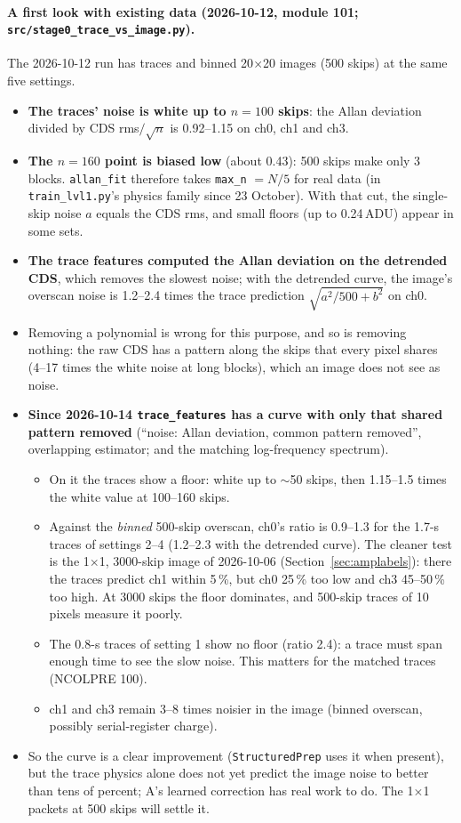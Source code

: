 \documentclass[10pt]{article}
\newcommand{\code}[1]{\texttt{#1}}
\begin{document}
\paragraph{A first look with existing data (2026-10-12, module 101; \code{src/stage0\_trace\_vs\_image.py}).} The 2026-10-12 run has
traces and binned 20$\times$20 images (500 skips) at the same five settings.
\begin{itemize}
\item \textbf{The traces' noise is white up to $n = 100$ skips}: the Allan deviation divided by CDS rms$/\sqrt n$ is 0.92--1.15 on ch0, ch1 and ch3.
\item \textbf{The $n = 160$ point is biased low} (about 0.43): 500 skips make only 3 blocks. \code{allan\_fit} therefore takes
  \code{max\_n} $= N/5$ for real data (in \code{train\_lvl1.py}'s physics family since 23 October). With that cut, the single-skip noise $a$ equals the CDS rms, and small floors (up to 0.24\,ADU)
  appear in some sets.
\item \textbf{The trace features computed the Allan deviation on the detrended CDS}, which removes the slowest noise; with the
  detrended curve, the image's overscan noise is 1.2--2.4 times the trace prediction $\sqrt{a^2/500 + b^2}$ on ch0.
\item Removing a polynomial is wrong for this purpose, and so is removing nothing: the raw CDS has a pattern along the skips that every
  pixel shares (4--17 times the white noise at long blocks), which an image does not see as noise.
\item \textbf{Since 2026-10-14 \code{trace\_features} has a curve with only that shared pattern removed} (``noise: Allan deviation,
  common pattern removed'', overlapping estimator; and the matching log-frequency spectrum).
  \begin{itemize}
  \item On it the traces show a floor: white up to $\sim$50 skips, then 1.15--1.5 times the white value at 100--160 skips.
  \item Against the \emph{binned} 500-skip overscan, ch0's ratio is 0.9--1.3 for the 1.7-s traces of settings 2--4 (1.2--2.3 with the
    detrended curve). The cleaner test is the 1$\times$1, 3000-skip image of 2026-10-06 (Section~\ref{sec:amplabels}): there the traces
    predict ch1 within 5\,\%, but ch0 25\,\% too low and ch3 45--50\,\% too high. At 3000 skips the floor dominates, and 500-skip traces
    of 10 pixels measure it poorly.
  \item The 0.8-s traces of setting 1 show no floor (ratio 2.4): a trace must span enough time to see the slow noise. This matters for
    the matched traces (NCOLPRE 100).
  \item ch1 and ch3 remain 3--8 times noisier in the image (binned overscan, possibly serial-register charge).
  \end{itemize}
\item So the curve is a clear improvement (\code{StructuredPrep} uses it when present), but the trace physics alone does not yet
  predict the image noise to better than tens of percent; A's learned correction has real work to do. The 1$\times$1 packets at 500
  skips will settle it.
\end{itemize}
\end{document}
